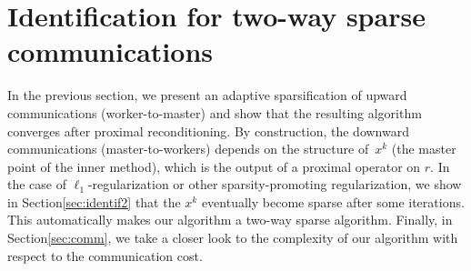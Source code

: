 \section{Identification for two-way sparse communications}\label{sec:spy-identification}

In the previous section, we present an adaptive sparsification of upward communications (worker-to-master) and show that the resulting algorithm converges after proximal reconditioning. By construction, the downward communications (master-to-workers) depends on the structure of~$x^k$ (the master point of the inner method), which is the output of a proximal operator on $r$. In the case of $\ell_1$-regularization or other sparsity-promoting regularization\;\cite{bach2012optimization}, we show in Section\;\ref{sec:identif2} that the $x^k$ eventually become sparse after some iterations. This automatically makes our algorithm a two-way sparse algorithm. 
Finally, in Section\;\ref{sec:comm}, we take a closer look to the complexity of our algorithm with respect to the communication cost.

